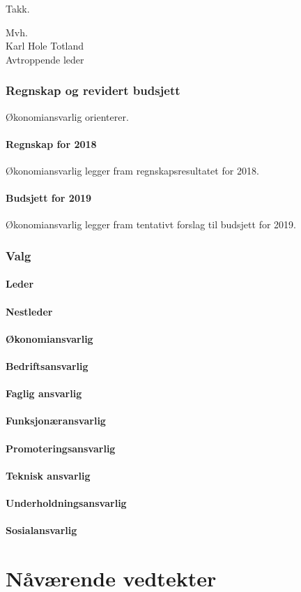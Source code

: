 \documentclass[10pt,norsk,a4paper]{article}
\begin{document}
Takk.

Mvh. \\
Karl Hole Totland \\
Avtroppende leder \\

\section{Regnskap og revidert budsjett}
Økonomiansvarlig orienterer.

\subsection{Regnskap for 2018}
Økonomiansvarlig legger fram regnskapsresultatet for 2018.

\subsection{Budsjett for 2019}
Økonomiansvarlig legger fram tentativt forslag til budsjett for 2019.

\section{Valg}

\subsection{Leder}
\subsection{Nestleder}
\subsection{Økonomiansvarlig}
\subsection{Bedriftsansvarlig}
\subsection{Faglig ansvarlig}
\subsection{Funksjonæransvarlig}
\subsection{Promoteringsansvarlig}
\subsection{Teknisk ansvarlig}
\subsection{Underholdningsansvarlig}
\subsection{Sosialansvarlig}\label{lastpage}

\newpage
\part{Nåværende vedtekter}

\end{document}

